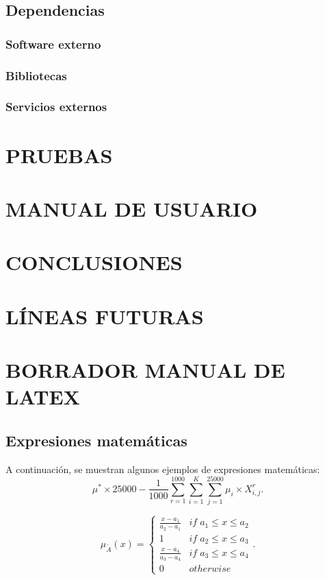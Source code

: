 \documentclass[spanish,12pt, a4paper, twoside]{paper}
\let\oldsection\section
\def\section{\cleardoublepage\oldsection}
\begin{document}
\subsection{Dependencias}

\subsubsection{Software externo}

\subsubsection{Bibliotecas}

\subsubsection{Servicios externos}

\section{PRUEBAS}

\section{MANUAL DE USUARIO}

\section{CONCLUSIONES}

\section{LÍNEAS FUTURAS}

\section{BORRADOR MANUAL DE LATEX}

\subsection{Expresiones matemáticas}
A continuación, se muestran algunos ejemplos de expresiones matemáticas:
\begin{equation}
\mu^*\times 25000-\frac{1}{1000}\sum_{r=1}^{1000}\sum_{i=1}^{K}\sum_{j=1}^{25000}\mu_i\times X_{i,j}^r.
\end{equation}

\begin{equation}
\mu_{\widetilde{A}}(x)=\left\{ \begin{array}{cc}
\frac{x-a_{1}}{a_{2}-a_{1}} & if\; a_{1}\leq x\leq a_{2}\\
1 & if\; a_{2}\leq x\leq a_{3}\\
\frac{x-a_{4}}{a_{3}-a_{4}} & if\; a_{3}\leq x\leq a_{4}\\
0 & otherwise
\end{array}\right. .
\end{equation}
\end{document}

